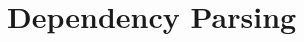 \begin{comment}
	\pagebreak
\end{comment}

\section{Dependency Parsing}
\begin{comment}
\subsection{Structure}

	\begin{itemize}
	
	\item Dependency Parsing
	\begin{itemize}
	\item Definition
	\item Projectivity
	\item Graph-based dependency Parsing
	\end{itemize}
	
	\item Probabilistic Inference
	\begin{itemize}
	\item Learning Objective
	\item Matrix Tree Theorem
	\end{itemize}
	
	\item Decoding Trees
	\begin{itemize}
	\item MST Algorithm
	\item Root Constraint
	\end{itemize}
	
	\end{itemize}
\end{comment}

\begin{comment}
	Alternative tradition to constituency grammar. 
	Every word is linked to it's syntactic head, whereas each connection between words has a superior and an inferior term. \\
\end{comment} 


